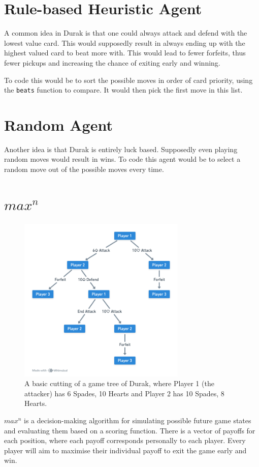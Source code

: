\documentclass[a4paper, twoside, 12pt]{report}
\begin{document}
\section{Rule-based Heuristic Agent}
A common idea in Durak is that one could always attack and defend with the lowest value card. This would supposedly result in always ending up with the highest valued card to beat more with. This would lead to fewer forfeits, thus fewer pickups and increasing the chance of exiting early and winning.

To code this would be to sort the possible moves in order of card priority, using the \verb|beats| function to compare. It would then pick the first move in this list.

\section{Random Agent}

Another idea is that Durak is entirely luck based. Supposedly even playing random moves would result in wins. To code this agent would be to select a random move out of the possible moves every time.

\section{\(max^n\)}

\begin{figure}[h]
	\centering
	\includegraphics[width=8cm]{gametree.png}
	\caption{A basic cutting of a game tree of Durak, where Player 1 (the attacker) has 6 Spades, 10 Hearts and Player 2 has 10 Spades, 8 Hearts.}
	\label{fig:gametree}
\end{figure}

\(max^n\) is a decision-making algorithm for simulating possible future game states and evaluating them based on a scoring function. There is a vector of payoffs for each position, where each payoff corresponds personally to each player. Every player will aim to maximise their individual payoff to exit the game early and win.
\end{document}
